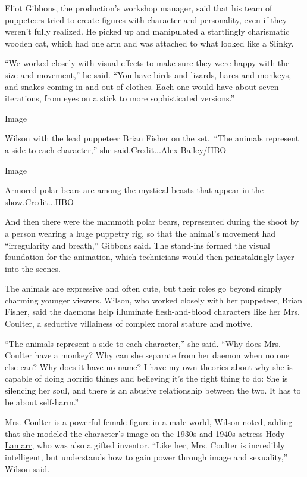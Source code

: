 Eliot Gibbons, the production's workshop manager, said that his team of
puppeteers tried to create figures with character and personality, even
if they weren't fully realized. He picked up and manipulated a
startlingly charismatic wooden cat, which had one arm and was attached
to what looked like a Slinky.

``We worked closely with visual effects to make sure they were happy
with the size and movement,'' he said. ``You have birds and lizards,
hares and monkeys, and snakes coming in and out of clothes. Each one
would have about seven iterations, from eyes on a stick to more
sophisticated versions.''

Image

Wilson with the lead puppeteer Brian Fisher on the set.~``The animals
represent a side to each character,'' she said.Credit...Alex Bailey/HBO

Image

Armored polar bears are among the mystical beasts that appear in the
show.Credit...HBO

And then there were the mammoth polar bears, represented during the
shoot by a person wearing a huge puppetry rig, so that the animal's
movement had ``irregularity and breath,'' Gibbons said. The stand-ins
formed the visual foundation for the animation, which technicians would
then painstakingly layer into the scenes.

The animals are expressive and often cute, but their roles go beyond
simply charming younger viewers. Wilson, who worked closely with her
puppeteer, Brian Fisher, said the daemons help illuminate
flesh-and-blood characters like her Mrs. Coulter, a seductive villainess
of complex moral stature and motive.

``The animals represent a side to each character,'' she said. ``Why does
Mrs. Coulter have a monkey? Why can she separate from her daemon when no
one else can? Why does it have no name? I have my own theories about why
she is capable of doing horrific things and believing it's the right
thing to do: She is silencing her soul, and there is an abusive
relationship between the two. It has to be about self-harm.''

Mrs. Coulter is a powerful female figure in a male world, Wilson noted,
adding that she modeled the character's image on the
\href{https://www.biography.com/actor/hedy-lamarr}{1930s and 1940s
actress} \href{https://www.biography.com/actor/hedy-lamarr}{Hedy
Lamarr}, who was also a gifted inventor. ``Like her, Mrs. Coulter is
incredibly intelligent, but understands how to gain power through image
and sexuality,'' Wilson said.

